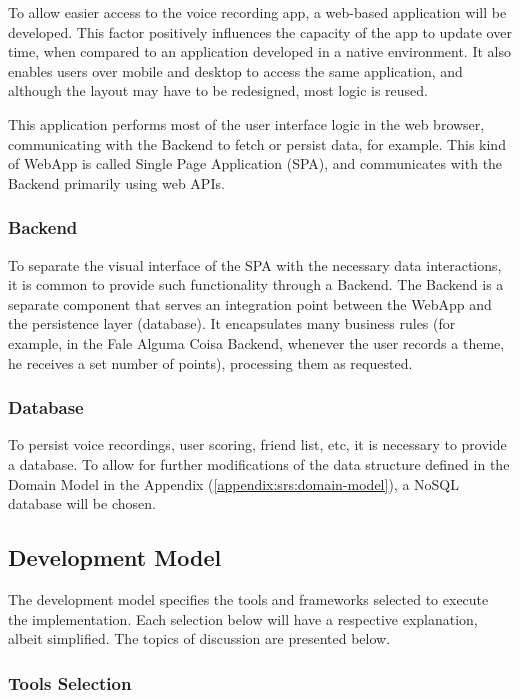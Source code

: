 To allow easier access to the voice recording app, a web-based application will be developed. This factor positively influences the capacity of the app to update over time, when compared to an application developed in a native environment. It also enables users over mobile and desktop to access the same application, and although the layout may have to be redesigned, most logic is reused. 

This application performs most of the user interface logic in the web browser, communicating with the Backend to fetch or persist data, for example. This kind of WebApp is called Single Page Application (SPA), and communicates with the Backend primarily using web APIs.

\subsubsection{Backend}
\label{sec:webapp-implementation}

To separate the visual interface of the SPA with the necessary data interactions, it is common to provide such functionality through a Backend. The Backend is a separate component that serves an integration point between the WebApp and the persistence layer (database). It encapsulates many business rules (for example, in the Fale Alguma Coisa Backend, whenever the user records a theme, he receives a set number of points), processing them as requested.

\subsubsection{Database}

To persist voice recordings, user scoring, friend list, etc, it is necessary to provide a database. To allow for further modifications of the data structure defined in the Domain Model in the Appendix (\ref{appendix:srs:domain-model}), a NoSQL database will be chosen.

\subsection{Development Model}

The development model specifies the tools and frameworks selected to execute the implementation. Each selection below will have a respective explanation, albeit simplified. The topics of discussion are presented below.

\subsubsection{Tools Selection}

